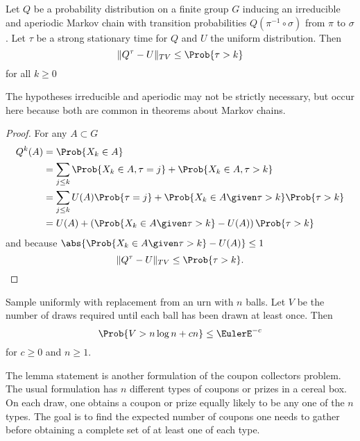 \documentclass[12pt]{article}
\begin{document}
\begin{lemma}
    \label{lem:cardshuffling:stoptime} Let \( Q \) be a probability
    distribution on a finite group \( G \) inducing an irreducible and
    aperiodic Markov chain
    with transition probabilities \( Q(\pi^{-1} \circ \sigma) \)
    from \( \pi \) to \( \sigma \).   Let \( \tau \) be a strong
    stationary time for \( Q \) and \( U \) the uniform distribution.  Then
    \[
        \| Q^{\tau} - U \|_{TV} \le \Prob{\tau > k}
    \] for all \( k \ge 0 \)
\end{lemma}

\begin{remark}
    The hypotheses irreducible and aperiodic may not be strictly
    necessary, but occur here because both are common in theorems about
    Markov chains.
\end{remark}

\begin{proof}
    For any \( A \subset G \)
    \begin{align*}
        Q^{k}(A) &= \Prob{X_k \in A} \\
        &= \sum_{j \le k} \Prob{X_k \in A, \tau = j} + \Prob{X_k \in A,
        \tau >k} \\
        &= \sum_{j \le k} U(A) \Prob{\tau = j} + \Prob{X_k \in A \given
        \tau >k} \Prob{\tau > k} \\
        &= U(A) + \left( \Prob{X_k \in A \given \tau >k} - U(A) \right)
        \Prob{\tau > k}
    \end{align*}
    and because \( \abs{\Prob{X_k \in A \given \tau >k} - U(A)} \le 1 \)
    \[
        \| Q^{\tau} - U \|_{TV} \le \Prob{\tau > k}.
    \]
\end{proof}

\begin{lemma}
    \label{lem:cardshuffling:coupon} Sample uniformly with replacement
    from an urn with \( n \) balls.  Let \( V \) be the number of draws
    required until each ball has been drawn at least once.  Then
    \[
        \Prob{V > n \log n + c n} \le \EulerE^{-c}
    \] for \( c \ge 0 \) and \( n \ge 1 \).
\end{lemma}

\begin{remark}
    The lemma statement is another formulation of the coupon collectors
    problem.%
    The usual formulation has \( n \) different types of coupons or
    prizes in a cereal box.  On each draw, one obtains a coupon or prize
    equally likely to be any one of the \( n \) types.  The goal is to
    find the expected number of coupons one needs to gather before
    obtaining a complete set of at least one of each type.
\end{remark}
\end{document}

